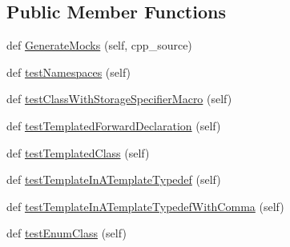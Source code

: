 \subsection*{Public Member Functions}
\begin{DoxyCompactItemize}
\item 
def \mbox{\hyperlink{classgoogletest-master_1_1googlemock_1_1scripts_1_1generator_1_1cpp_1_1gmock__class__test_1_1_generate_mocks_test_a5c38fdc59de270099bd62c364ad52f05}{Generate\+Mocks}} (self, cpp\+\_\+source)
\item 
def \mbox{\hyperlink{classgoogletest-master_1_1googlemock_1_1scripts_1_1generator_1_1cpp_1_1gmock__class__test_1_1_generate_mocks_test_a6cb85ee29cdaf55ef9eaad938975b804}{test\+Namespaces}} (self)
\item 
def \mbox{\hyperlink{classgoogletest-master_1_1googlemock_1_1scripts_1_1generator_1_1cpp_1_1gmock__class__test_1_1_generate_mocks_test_a7871825e541ed87ea36c44dc8016dd8e}{test\+Class\+With\+Storage\+Specifier\+Macro}} (self)
\item 
def \mbox{\hyperlink{classgoogletest-master_1_1googlemock_1_1scripts_1_1generator_1_1cpp_1_1gmock__class__test_1_1_generate_mocks_test_a140fbee26cf2f5648061162a7380ce29}{test\+Templated\+Forward\+Declaration}} (self)
\item 
def \mbox{\hyperlink{classgoogletest-master_1_1googlemock_1_1scripts_1_1generator_1_1cpp_1_1gmock__class__test_1_1_generate_mocks_test_a23a5cd76fbdee9f9eefdec236039cf78}{test\+Templated\+Class}} (self)
\item 
def \mbox{\hyperlink{classgoogletest-master_1_1googlemock_1_1scripts_1_1generator_1_1cpp_1_1gmock__class__test_1_1_generate_mocks_test_a6e774c8c550c60bb420fc224a86c8ea3}{test\+Template\+In\+A\+Template\+Typedef}} (self)
\item 
def \mbox{\hyperlink{classgoogletest-master_1_1googlemock_1_1scripts_1_1generator_1_1cpp_1_1gmock__class__test_1_1_generate_mocks_test_a0c62ccd3046b21812e0a8a69d622ff26}{test\+Template\+In\+A\+Template\+Typedef\+With\+Comma}} (self)
\item 
def \mbox{\hyperlink{classgoogletest-master_1_1googlemock_1_1scripts_1_1generator_1_1cpp_1_1gmock__class__test_1_1_generate_mocks_test_ad528f7a4ecf264263f375c3e410c8109}{test\+Enum\+Class}} (self)
\end{DoxyCompactItemize}


